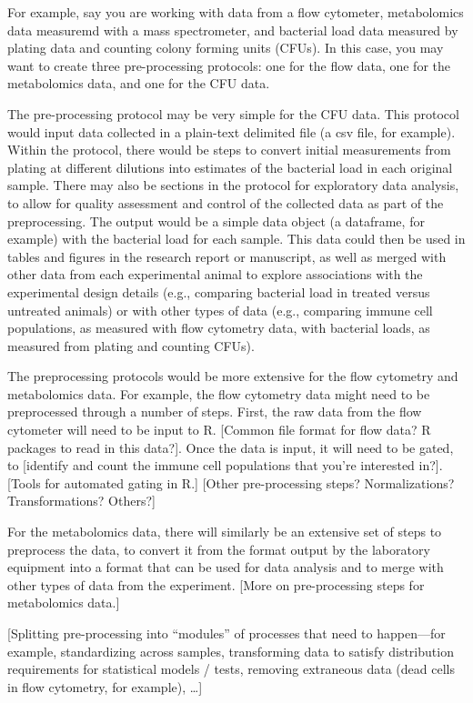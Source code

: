 \documentclass[]{tufte-book}
\begin{document}
For example, say you are working with data from a flow cytometer, metabolomics
data measuremd with a mass spectrometer, and bacterial load data measured by
plating data and counting colony forming units (CFUs). In this case, you may
want to create three pre-processing protocols: one for the flow data, one for
the metabolomics data, and one for the CFU data.

The pre-processing protocol may be very simple for the CFU data. This protocol
would input data collected in a plain-text delimited file (a csv file, for
example). Within the protocol, there would be steps to convert initial
measurements from plating at different dilutions into estimates of the bacterial
load in each original sample. There may also be sections in the protocol for
exploratory data analysis, to allow for quality assessment and control of the
collected data as part of the preprocessing. The output would be a simple data
object (a dataframe, for example) with the bacterial load for each sample. This
data could then be used in tables and figures in the research report or
manuscript, as well as merged with other data from each experimental animal to
explore associations with the experimental design details (e.g., comparing
bacterial load in treated versus untreated animals) or with other types of data
(e.g., comparing immune cell populations, as measured with flow cytometry data,
with bacterial loads, as measured from plating and counting CFUs).

The preprocessing protocols would be more extensive for the flow cytometry and
metabolomics data. For example, the flow cytometry data might need to be
preprocessed through a number of steps. First, the raw data from the flow
cytometer will need to be input to R. {[}Common file format for flow data? R
packages to read in this data?{]}. Once the data is input, it will need to be
gated, to {[}identify and count the immune cell populations that you're interested
in?{]}. {[}Tools for automated gating in R.{]} {[}Other pre-processing steps?
Normalizations? Transformations? Others?{]}

For the metabolomics data, there will similarly be an extensive set of steps to
preprocess the data, to convert it from the format output by the laboratory
equipment into a format that can be used for data analysis and to merge with
other types of data from the experiment. {[}More on pre-processing steps for
metabolomics data.{]}

{[}Splitting pre-processing into ``modules'' of processes that need to happen---for
example, standardizing across samples, transforming data to satisfy distribution
requirements for statistical models / tests, removing extraneous data (dead
cells in flow cytometry, for example), \ldots{]}
\end{document}
